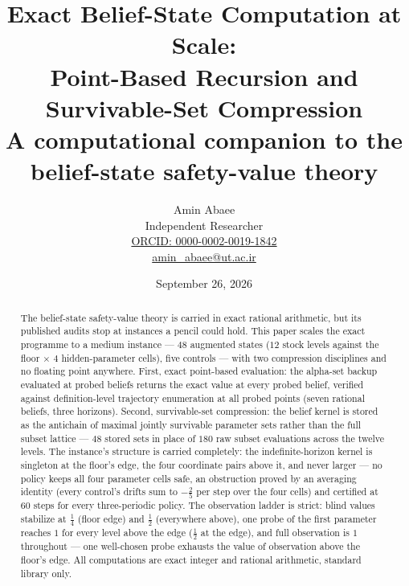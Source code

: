 \documentclass[10pt,twocolumn]{article}
\theoremstyle{plain}
\theoremstyle{definition}
\theoremstyle{remark}
\begin{document}
\title{Exact Belief-State Computation at Scale:\\
Point-Based Recursion and Survivable-Set Compression\\[0.2em]
{\large\rmfamily A computational companion to the belief-state
safety-value theory}}
\author{Amin Abaee\\[0.35em]
{\small Independent Researcher}\\[0.55em]
{\small\href{https://orcid.org/0000-0002-0019-1842}{ORCID: 0000-0002-0019-1842}}\\[0.3em]
{\small\href{mailto:amin\_abaee@ut.ac.ir}{amin\_abaee@ut.ac.ir}}}
\date{September 26, 2026}
\maketitle

\begin{abstract}
The belief-state safety-value theory is carried in exact rational
arithmetic, but its published audits stop at instances a pencil could
hold. This paper scales the exact programme to a medium instance ---
\(48\) augmented states (\(12\) stock levels against the floor
\(\times\) \(4\) hidden-parameter cells), five controls --- with two
compression disciplines and no floating point anywhere. First, exact
point-based evaluation: the alpha-set backup evaluated at probed beliefs
returns the exact value at every probed belief, verified against
definition-level trajectory enumeration at all probed points (seven
rational beliefs, three horizons). Second, survivable-set compression:
the belief kernel is stored as the antichain of maximal jointly
survivable parameter sets rather than the full subset lattice ---
\(48\) stored sets in place of \(180\) raw subset evaluations across the
twelve levels. The instance's structure is carried completely: the
indefinite-horizon kernel is singleton at the floor's edge, the four
coordinate pairs above it, and never larger --- no policy keeps all four
parameter cells safe, an obstruction proved by an averaging identity
(every control's drifts sum to \(-\tfrac25\) per step over the four
cells) and certified at \(60\) steps for every three-periodic policy.
The observation ladder is strict: blind values stabilize at
\(\tfrac14\) (floor edge) and \(\tfrac12\) (everywhere above), one
probe of the first parameter reaches \(1\) for every level above the
edge (\(\tfrac12\) at the edge), and full observation is \(1\)
throughout --- one well-chosen probe exhausts the value of observation
above the floor's edge. All computations are exact integer and rational
arithmetic, standard library only.
\end{abstract}
\end{document}
